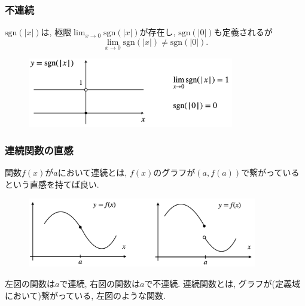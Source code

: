 \documentclass[dvipdfmx,cjk,10.2pt]{beamer}
\theoremstyle{definition}
\begin{document}


\begin{frame}
\frametitle{不連続} 



$\mathrm{sgn}(|x|)$は, 極限$\displaystyle \lim_{x\to 0}\mathrm{sgn}(|x|)$が存在し, $\mathrm{sgn}(|0|)$も定義されるが
$$
\lim_{x\to 0}\mathrm{sgn}(|x|) \neq  \mathrm{sgn}(|0|).
$$ 

\vspace{-1mm}

 \begin{figure}[htbp]
 \begin{center} 
  \includegraphics[width=90mm]{sgn_abs.png}
 \end{center}
\end{figure}

\vspace{-1mm}


\end{frame}




\begin{frame}
\frametitle{連続関数の直感} 


関数$f(x)$が$a$において連続とは, $f(x)$のグラフが$(a,f(a))$で繋がっているという直感を持てば良い. 



 \begin{figure}[htbp]
 \begin{center} 
  \includegraphics[width=100mm]{(dis)conti.png}
 \end{center}
\end{figure}

左図の関数は$a$で連続, 右図の関数は$a$で不連続. 
連続関数とは, グラフが(定義域において)繋がっている, 左図のような関数. 

\end{frame}
\end{document}
